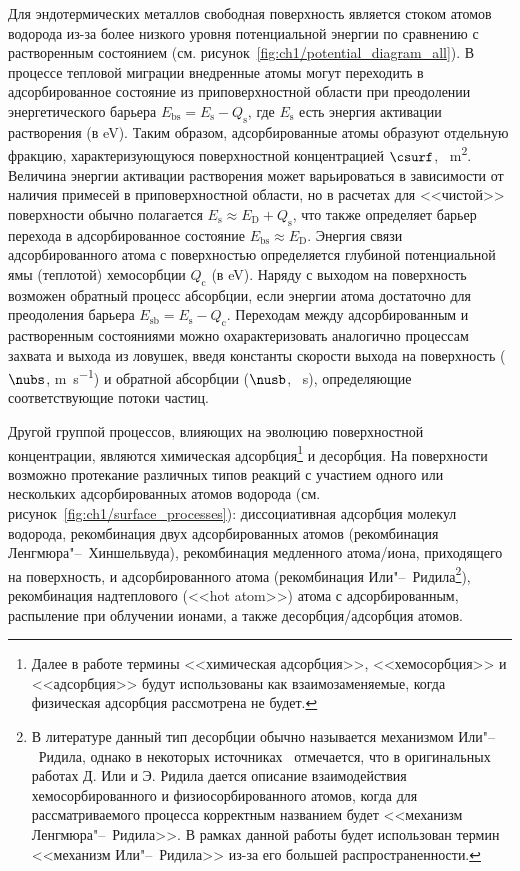 Для эндотермических металлов свободная поверхность является стоком атомов водорода из-за более низкого уровня потенциальной энергии по сравнению с растворенным состоянием (см. рисунок~\cref{fig:ch1/potential_diagram_all}). В процессе тепловой миграции внедренные атомы могут переходить в адсорбированное состояние из приповерхностной области при преодолении энергетического барьера \( E_\mathrm{bs}=E_\mathrm{s}-Q_\mathrm{s} \), где \( E_\mathrm{s} \) есть энергия активации растворения (в \si{\electronvolt}). Таким образом, адсорбированные атомы образуют отдельную фракцию, характеризующуюся поверхностной концентрацией \( \csurf \), \si{\per\meter\squared}. Величина энергии активации растворения может варьироваться в зависимости от наличия примесей в приповерхностной области, но в расчетах для <<чистой>> поверхности обычно полагается \( E_\mathrm{s} \approx E_\mathrm{D} + Q_\mathrm{s} \), что также определяет барьер перехода в адсорбированное состояние \(  E_\mathrm{bs} \approx E_\mathrm{D} \). Энергия связи адсорбированного атома с поверхностью определяется глубиной потенциальной ямы (теплотой) хемосорбции \( Q_\mathrm{c} \) (в \si{\electronvolt}). Наряду с выходом на поверхность возможен обратный процесс абсорбции, если энергии атома достаточно для преодоления барьера \( E_\mathrm{sb} = E_\mathrm{s} - Q_\mathrm{c} \). Переходам между адсорбированным и растворенным состояниями можно охарактеризовать аналогично процессам захвата и выхода из ловушек, введя константы скорости выхода на поверхность (\( \nubs \), \si{\meter\per\second}) и обратной абсорбции (\( \nusb \), \si{\per\second}), определяющие соответствующие потоки частиц.

Другой группой процессов, влияющих на эволюцию поверхностной концентрации, являются химическая адсорбция\footnote{Далее в работе термины <<химическая адсорбция>>, <<хемосорбция>> и <<адсорбция>> будут использованы как взаимозаменяемые, когда физическая адсорбция рассмотрена не будет.} и десорбция. На поверхности возможно протекание различных типов реакций с участием одного или нескольких адсорбированных атомов водорода (см. рисунок~\cref{fig:ch1/surface_processes}): диссоциативная адсорбция молекул водорода, рекомбинация двух адсорбированных атомов (рекомбинация Ленгмюра"--~Хиншельвуда), рекомбинация медленного атома/иона, приходящего на поверхность, и адсорбированного атома (рекомбинация Или"--~Ридила\footnote{В литературе данный тип десорбции обычно называется механизмом Или"--~Ридила, однако в некоторых источниках~\cite{Prins2018} отмечается, что в оригинальных работах Д. Или и Э. Ридила дается описание взаимодействия хемосорбированного и физиосорбированного атомов, когда для рассматриваемого процесса корректным названием будет <<механизм Ленгмюра"--~Ридила>>. В рамках данной работы будет использован термин <<механизм Или"--~Ридила>> из-за его большей распространенности.}), рекомбинация надтеплового (<<hot atom>>) атома с адсорбированным, распыление при облучении ионами, а также десорбция/адсорбция атомов. 

